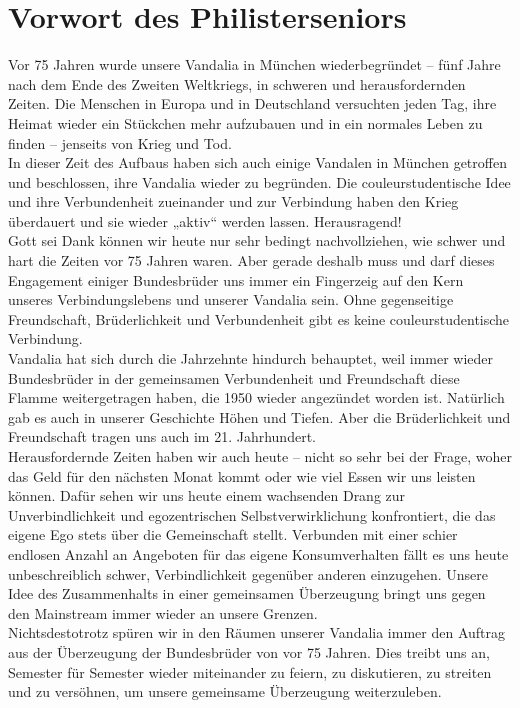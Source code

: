 \section{Vorwort des Philisterseniors}


\begin{multicols}{2}

Vor 75 Jahren wurde unsere Vandalia in München
wiederbegründet – fünf Jahre nach dem Ende des Zweiten Weltkriegs, in schweren
und herausfordernden Zeiten. Die Menschen in Europa und in Deutschland
versuchten jeden Tag, ihre Heimat wieder ein Stückchen mehr aufzubauen und in
ein normales Leben zu finden – jenseits von Krieg und Tod.\\
In dieser Zeit des Aufbaus haben sich auch einige Vandalen
in München getroffen und beschlossen, ihre Vandalia wieder zu begründen. Die
couleurstudentische Idee und ihre Verbundenheit zueinander und zur Verbindung
haben den Krieg überdauert und sie wieder „aktiv“ werden lassen. Herausragend!\\
Gott sei Dank können wir heute nur sehr bedingt
nachvollziehen, wie schwer und hart die Zeiten vor 75 Jahren waren. Aber gerade
deshalb muss und darf dieses Engagement einiger Bundesbrüder uns immer ein
Fingerzeig auf den Kern unseres Verbindungslebens und unserer Vandalia sein.
Ohne gegenseitige Freundschaft, Brüderlichkeit und Verbundenheit gibt es keine
couleurstudentische Verbindung.\\
Vandalia hat sich durch die Jahrzehnte hindurch behauptet,
weil immer wieder Bundesbrüder in der gemeinsamen Verbundenheit und
Freundschaft diese Flamme weitergetragen haben, die 1950 wieder angezündet
worden ist. Natürlich gab es auch in unserer Geschichte Höhen und Tiefen. Aber
die Brüderlichkeit und Freundschaft tragen uns auch im 21. Jahrhundert.\\
Herausfordernde Zeiten haben wir auch heute – nicht so sehr
bei der Frage, woher das Geld für den nächsten Monat kommt oder wie viel Essen
wir uns leisten können. Dafür sehen wir uns heute einem wachsenden Drang zur
Unverbindlichkeit und egozentrischen Selbstverwirklichung konfrontiert, die das
eigene Ego stets über die Gemeinschaft stellt. Verbunden mit einer schier
endlosen Anzahl an Angeboten für das eigene Konsumverhalten fällt es uns heute
unbeschreiblich schwer, Verbindlichkeit gegenüber anderen einzugehen. Unsere
Idee des Zusammenhalts in einer gemeinsamen Überzeugung bringt uns gegen den
Mainstream immer wieder an unsere Grenzen.\\
Nichtsdestotrotz spüren wir in den Räumen unserer Vandalia
immer den Auftrag aus der Überzeugung der Bundesbrüder von vor 75 Jahren. Dies
treibt uns an, Semester für Semester wieder miteinander zu feiern, zu
diskutieren, zu streiten und zu versöhnen, um unsere gemeinsame Überzeugung
weiterzuleben.


\end{multicols}
